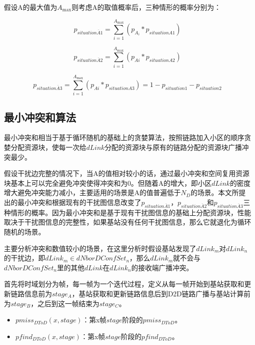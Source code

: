 \documentclass[figurelist,tablelist,algorithmlist,nomlist,masters]{seuthesix}
\begin{document}
	假设A的最大值为${A_{\max }}$则考虑A的取值概率后，三种情形的概率分别为：
	
	\begin{equation}\label{eq3.1}
	{p_{situation\overline A 1}} = \sum\limits_{i = 1}^{{A_{\max }}} {({p_{{A_i}}}*{p_{situationA1}})}
	\end{equation}
	
	\begin{equation}\label{eq3.1}
	{p_{situation\overline A {2}}} = \sum\limits_{i = 1}^{{A_{\max }}} {({p_{Ai}}*{p_{situationA{2}}})}
	\end{equation}
	
	\begin{equation}\label{eq3.1}
	{p_{situation\overline A 3}} = \sum\limits_{i = 1}^{{A_{\max }}} {({p_{Ai}}*{p_{situationA{3}}}) = } 1 - {p_{situation1}} - {p_{situation{2}}}
	\end{equation}
	
	\subsection{最小冲突和算法}
	最小冲突和相当于基于循环随机的基础上的贪婪算法，按照链路加入小区的顺序贪婪分配资源块，使每一次给$dLink$分配的资源块与原有的链路分配的资源块广播冲突最少。
	
	假设干扰边完整的情况下，当A的值相对较小的话，通过最小冲突和空间复用资源块基本上可以完全避免冲突使得冲突和为0。但随着A的增大，即小区$dLink$的密度增大避免冲突能力减小，主要适用的场景是A的值普遍低于$N_D$的场景。本文所提出的最小冲突和根据现有的干扰图信息改变了${p_{situation\overline A 1}}$，${p_{situation\overline A 2}}$和${p_{situation\overline A 3}}$三种情形的概率。因为最小冲突和是基于现有干扰图信息的基础上分配资源块，性能取决于干扰图信息的完整性，如果基站没有任何干扰图信息，那么它就退化为循环随机的场景。
	
	主要分析冲突和数值较小的场景，在这里分析时假设基站发现了$dLink_m$对$dLink_n$的干扰边，即$dLink_m \in dNborDConfSe{t_n}$，那么$dLink_m$就不会与$dNborDConfSe{t_n}$里的其他$dLink$在$dLink_n$的接收端广播冲突。
	
	首先将时域划分为帧，每一帧为一个迭代过程，定义从每一帧开始到基站获取和更新链路信息前为$stag{e_A}$，基站获取和更新链路信息后到D2D链路广播与基站计算前为$stag{e_B}$，之后到这一帧结束为$stag{e_C}$。
	
	\begin{itemize}
		\item $pmis{s_{DToD}}(x,stage)$：第x帧$stage$阶段的$pmis{s_{DToD}}$。
		\item $pfin{d_{DToD}}(x,stage)$：第x帧$stage$阶段的$pfin{d_{DToD}}$。
	\end{itemize}
	
\end{document}
